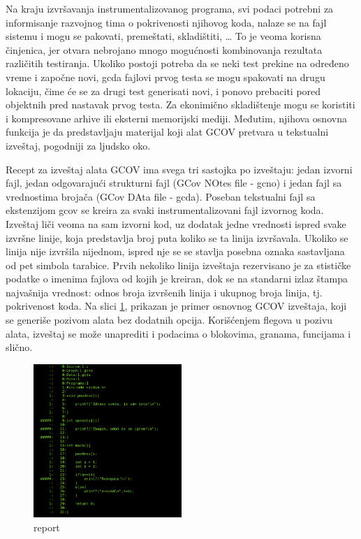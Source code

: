 \documentclass[12pt,oneside]{memoir}
\begin{document}
Na kraju izvršavanja instrumentalizovanog programa, svi podaci potrebni za informisanje razvojnog tima o pokrivenosti njihovog koda, nalaze se na fajl sistemu i mogu se pakovati, premeštati, skladištiti, … To je veoma korisna činjenica, jer otvara nebrojano mnogo mogućnosti kombinovanja rezultata različitih testiranja. Ukoliko postoji potreba da se neki test prekine na određeno vreme i započne novi, gcda fajlovi prvog testa se mogu spakovati na drugu lokaciju, čime će se za drugi test generisati novi, i ponovo prebaciti pored objektnih pred nastavak prvog testa. Za ekonimično skladištenje mogu se koristiti i kompresovane arhive ili eksterni memorijski mediji. Međutim, njihova osnovna funkcija je da predstavljaju materijal koji alat GCOV pretvara u tekstualni izveštaj, pogodniji za ljudsko oko. 


Recept za izveštaj alata GCOV ima svega tri sastojka po izveštaju: jedan izvorni fajl, jedan odgovarajući strukturni fajl (GCov NOtes file - gcno) i jedan fajl sa vrednostima brojača (GCov DAta file - gcda). Poseban tekstualni fajl sa ekstenzijom gcov se kreira za svaki instrumentalizovani fajl izvornog koda. Izveštaj liči veoma na sam izvorni kod, uz dodatak jedne vrednosti ispred svake izvršne linije, koja predstavlja broj puta koliko se ta linija izvršavala. Ukoliko se linija nije izvršila nijednom, ispred nje se se stavlja posebna oznaka sastavljana od pet simbola tarabice. Prvih nekoliko linija izveštaja rezervisano je za stističke podatke o imenima fajlova od kojih je kreiran, dok se na standarni izlaz štampa najvašnija vrednost: odnos broja izvršenih linija i ukupnog broja linija, tj. pokrivenost koda. Na slici \ref{fig:report}, prikazan je primer osnovnog GCOV izveštaja, koji se generiše pozivom alata bez dodatnih opcija. Korišćenjem flegova u pozivu alata, izveštaj se može unaprediti i podacima o blokovima, granama, funcijama i slično.


\begin{figure}[!ht]
  \centering
  \label{fig:report}
  \includegraphics[width=0.5\textwidth]{report.png}
  \caption{report}
\end{figure}
\end{document}

